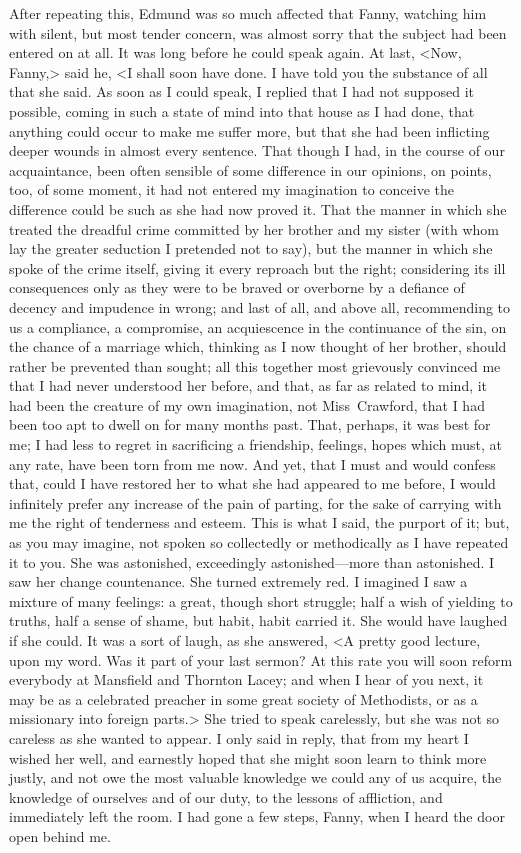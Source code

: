 After repeating this, Edmund was so much affected that Fanny, watching him with silent, but most tender concern, was almost sorry that the subject had been entered on at all. It was long before he could speak again. At last, <Now, Fanny,> said he, <I shall soon have done. I have told you the substance of all that she said. As soon as I could speak, I replied that I had not supposed it possible, coming in such a state of mind into that house as I had done, that anything could occur to make me suffer more, but that she had been inflicting deeper wounds in almost every sentence. That though I had, in the course of our acquaintance, been often sensible of some difference in our opinions, on points, too, of some moment, it had not entered my imagination to conceive the difference could be such as she had now proved it. That the manner in which she treated the dreadful crime committed by her brother and my sister (with whom lay the greater seduction I pretended not to say), but the manner in which she spoke of the crime itself, giving it every reproach but the right; considering its ill consequences only as they were to be braved or overborne by a defiance of decency and impudence in wrong; and last of all, and above all, recommending to us a compliance, a compromise, an acquiescence in the continuance of the sin, on the chance of a marriage which, thinking as I now thought of her brother, should rather be prevented than sought; all this together most grievously convinced me that I had never understood her before, and that, as far as related to mind, it had been the creature of my own imagination, not Miss~Crawford, that I had been too apt to dwell on for many months past. That, perhaps, it was best for me; I had less to regret in sacrificing a friendship, feelings, hopes which must, at any rate, have been torn from me now. And yet, that I must and would confess that, could I have restored her to what she had appeared to me before, I would infinitely prefer any increase of the pain of parting, for the sake of carrying with me the right of tenderness and esteem. This is what I said, the purport of it; but, as you may imagine, not spoken so collectedly or methodically as I have repeated it to you. She was astonished, exceedingly astonished—more than astonished. I saw her change countenance. She turned extremely red. I imagined I saw a mixture of many feelings: a great, though short struggle; half a wish of yielding to truths, half a sense of shame, but habit, habit carried it. She would have laughed if she could. It was a sort of laugh, as she answered, <A pretty good lecture, upon my word. Was it part of your last sermon? At this rate you will soon reform everybody at Mansfield and Thornton Lacey; and when I hear of you next, it may be as a celebrated preacher in some great society of Methodists, or as a missionary into foreign parts.> She tried to speak carelessly, but she was not so careless as she wanted to appear. I only said in reply, that from my heart I wished her well, and earnestly hoped that she might soon learn to think more justly, and not owe the most valuable knowledge we could any of us acquire, the knowledge of ourselves and of our duty, to the lessons of affliction, and immediately left the room. I had gone a few steps, Fanny, when I heard the door open behind me. 